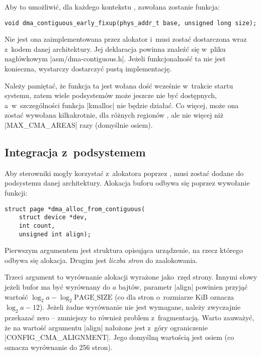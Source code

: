 Aby to umożliwić, dla każdego kontekstu , zawołana zostanie funkcja:

\begin{lstlisting}
void dma_contiguous_early_fixup(phys_addr_t base, unsigned long size);
\end{lstlisting}

Nie jest ona zaimplementowana przez alokator  i~musi zostać
dostarczona wraz z~kodem danej architektury.  Jej deklaracja powinna
znaleźć się w~pliku nagłówkowym \code|asm/dma-contiguous.h|.  Jeżeli
funkcjonalność ta nie jest konieczna, wystarczy dostarczyć pustą
implementację.

Należy pamiętać, że funkcja ta jest wołana dość wcześnie w~trakcie
startu systemu, zatem wiele podsystemów może jeszcze nie być
dostępnych, a~w~szczególności funkcja \code|kmalloc| nie będzie
działać.  Co więcej, może ona zostać wywołana kilkakrotnie, dla
różnych regionów , ale nie więcej niż \code|MAX_CMA_AREAS| razy
(domyślnie osiem).

\subsection{Integracja z~podsystemem }\label{sec:usage-integrate}

Aby sterowniki mogły korzystać z~alokatora  poprzez  , 
musi zostać dodane do podsystemu  danej architektury.  Alokacja
buforu  odbywa się poprzez wywołanie funkcji:

\begin{lstlisting}
struct page *dma_alloc_from_contiguous(
	struct device *dev,
	int count,
	unsigned int align);
\end{lstlisting}

Pierwszym argumentem jest struktura opisująca urządzenie, na rzecz
którego odbywa się alokacja.  Drugim jest \emph{liczba stron} do
zaalokowania.

Trzeci argument to wyrównanie alokacji wyrażone jako~rzęd strony.
Innymi słowy jeżeli bufor ma być wyrównany do $a$ bajtów, parametr
\code|align| powinien przyjąć wartość $\log_2 a - \log_2
\mathrm{PAGE\_SIZE}$ (co dla stron o~rozmiarze \unit[4096]{KiB}
oznacza $\log_2 a - 12$).  Jeżeli żadne wyrównanie nie jest wymagane,
należy zwyczajnie przekazać zero -- zmniejszy to również problem
z~fragmentacją.  Warto zauważyć, że na wartość argumentu \code|align|
nałożone jest z~góry ograniczenie \code|CONFIG_CMA_ALIGNMENT|.  Jego
domyślną wartością jest osiem (co oznacza wyrównanie do 256 stron).

